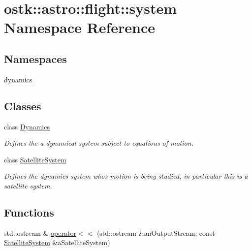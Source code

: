 \hypertarget{namespaceostk_1_1astro_1_1flight_1_1system}{}\section{ostk\+:\+:astro\+:\+:flight\+:\+:system Namespace Reference}
\label{namespaceostk_1_1astro_1_1flight_1_1system}
\subsection*{Namespaces}
\begin{DoxyCompactItemize}
\item 
 \hyperlink{namespaceostk_1_1astro_1_1flight_1_1system_1_1dynamics}{dynamics}
\end{DoxyCompactItemize}
\subsection*{Classes}
\begin{DoxyCompactItemize}
\item 
class \hyperlink{classostk_1_1astro_1_1flight_1_1system_1_1_dynamics}{Dynamics}
\begin{DoxyCompactList}\small\item\em Defines the a dynamical system subject to equations of motion. \end{DoxyCompactList}\item 
class \hyperlink{classostk_1_1astro_1_1flight_1_1system_1_1_satellite_system}{Satellite\+System}
\begin{DoxyCompactList}\small\item\em Defines the dynamics system who\textquotesingle{}s motion is being studied, in particular this is a satellite system. \end{DoxyCompactList}\end{DoxyCompactItemize}
\subsection*{Functions}
\begin{DoxyCompactItemize}
\item 
std\+::ostream \& \hyperlink{namespaceostk_1_1astro_1_1flight_1_1system_a170560632b71f8d3ec7f36e6c021d123}{operator$<$$<$} (std\+::ostream \&an\+Output\+Stream, const \hyperlink{classostk_1_1astro_1_1flight_1_1system_1_1_satellite_system}{Satellite\+System} \&a\+Satellite\+System)
\end{DoxyCompactItemize}



